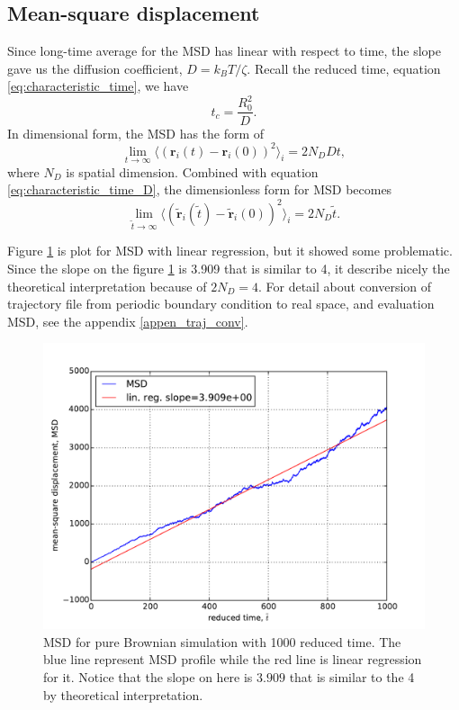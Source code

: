 \message{ !name(brief_Brownian_dynamics.tex)}\documentclass[10pt, a4paper]{report}
\begin{document}
\subsection{Mean-square displacement}
Since long-time average for the MSD has linear with respect to time, the slope gave us the diffusion coefficient, $D = k_BT/\zeta$. Recall the reduced time, equation \eqref{eq:characteristic_time}, we have
\begin{equation}
t_c = \frac{R_0^2}{D}.\label{eq:characteristic_time_D}
\end{equation}
In dimensional form, the MSD has the form of
\begin{equation}
\lim_{t\to\infty}\langle \left(\mathbf{r}_i(t)- \mathbf{r}_i(0)\right)^2\rangle_i = 2N_D Dt,
\end{equation}
where $N_D$ is spatial dimension.
Combined with equation \eqref{eq:characteristic_time_D}, the dimensionless form for MSD becomes
\begin{equation}
\lim_{\tilde{t}\to\infty}\langle \left(\tilde{\mathbf{r}}_i(\tilde{t})- \tilde{\mathbf{r}}_i(0)\right)^2\rangle_i = 2N_D\tilde{t}.
\end{equation}

Figure \ref{fig:MSD_brownian} is plot for MSD with linear regression, but it showed some problematic. Since the slope on the figure \ref{fig:MSD_brownian} is 3.909 that is similar to 4, it describe nicely the theoretical interpretation because of $2N_D = 4$.
For detail about conversion of trajectory file from periodic boundary condition to real space, and evaluation MSD, see the appendix \ref{appen_traj_conv}.

\begin{figure}
  \centering
  \includegraphics[width=\textwidth]{figures/MSD_2d_Brownian.pdf}
  \caption{MSD for pure Brownian simulation with 1000 reduced time. The blue line represent MSD profile while the red line is linear regression for it. Notice that the slope on here is $3.909$ that is similar to the 4 by theoretical interpretation.}
  \label{fig:MSD_brownian}
\end{figure}
\end{document}
